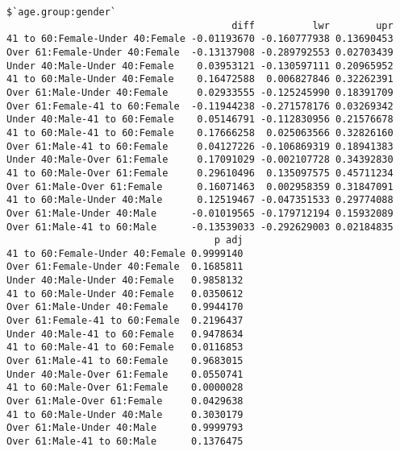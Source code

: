 \documentclass[12pt,a4paper]{article}\usepackage[]{graphicx}\usepackage[]{color}
\makeatletter
\newenvironment{kframe}{%
 \def\at@end@of@kframe{}%
 \ifinner\ifhmode%
  \def\at@end@of@kframe{\end{minipage}}%
  \begin{minipage}{\columnwidth}%
 \fi\fi%
 \def\FrameCommand##1{\hskip\@totalleftmargin \hskip-\fboxsep
 \colorbox{shadecolor}{##1}\hskip-\fboxsep
     \hskip-\linewidth \hskip-\@totalleftmargin \hskip\columnwidth}%
 \MakeFramed {\advance\hsize-\width
   \@totalleftmargin\z@ \linewidth\hsize
   \@setminipage}}%
 {\par\unskip\endMakeFramed%
 \at@end@of@kframe}
\newenvironment{knitrout}{}{} %
\makeatother
\begin{document}
\begin{enumerate}[(i)]
\begin{knitrout}
\begin{kframe}
\begin{verbatim}
$`age.group:gender`
                                       diff          lwr        upr
41 to 60:Female-Under 40:Female -0.01193670 -0.160777938 0.13690453
Over 61:Female-Under 40:Female  -0.13137908 -0.289792553 0.02703439
Under 40:Male-Under 40:Female    0.03953121 -0.130597111 0.20965952
41 to 60:Male-Under 40:Female    0.16472588  0.006827846 0.32262391
Over 61:Male-Under 40:Female     0.02933555 -0.125245990 0.18391709
Over 61:Female-41 to 60:Female  -0.11944238 -0.271578176 0.03269342
Under 40:Male-41 to 60:Female    0.05146791 -0.112830956 0.21576678
41 to 60:Male-41 to 60:Female    0.17666258  0.025063566 0.32826160
Over 61:Male-41 to 60:Female     0.04127226 -0.106869319 0.18941383
Under 40:Male-Over 61:Female     0.17091029 -0.002107728 0.34392830
41 to 60:Male-Over 61:Female     0.29610496  0.135097575 0.45711234
Over 61:Male-Over 61:Female      0.16071463  0.002958359 0.31847091
41 to 60:Male-Under 40:Male      0.12519467 -0.047351533 0.29774088
Over 61:Male-Under 40:Male      -0.01019565 -0.179712194 0.15932089
Over 61:Male-41 to 60:Male      -0.13539033 -0.292629003 0.02184835
                                    p adj
41 to 60:Female-Under 40:Female 0.9999140
Over 61:Female-Under 40:Female  0.1685811
Under 40:Male-Under 40:Female   0.9858132
41 to 60:Male-Under 40:Female   0.0350612
Over 61:Male-Under 40:Female    0.9944170
Over 61:Female-41 to 60:Female  0.2196437
Under 40:Male-41 to 60:Female   0.9478634
41 to 60:Male-41 to 60:Female   0.0116853
Over 61:Male-41 to 60:Female    0.9683015
Under 40:Male-Over 61:Female    0.0550741
41 to 60:Male-Over 61:Female    0.0000028
Over 61:Male-Over 61:Female     0.0429638
41 to 60:Male-Under 40:Male     0.3030179
Over 61:Male-Under 40:Male      0.9999793
Over 61:Male-41 to 60:Male      0.1376475
\end{verbatim}
\end{kframe}
\end{knitrout}
\end{enumerate}
\end{document}
